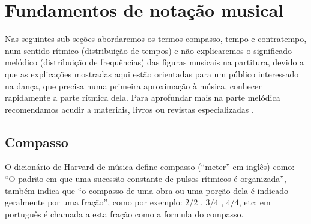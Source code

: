
\chapter{Fundamentos de notação musical}
Nas seguintes sub seções abordaremos os termos compasso, tempo e contratempo,
num sentido rítmico (distribuição de tempos) e não explicaremos o significado 
melódico (distribuição de frequências) das 
figuras musicais na partitura, devido a que as explicações mostradas aqui estão
orientadas para um público interessado na dança, que precisa numa primeira 
aproximação à música, conhecer rapidamente a parte rítmica dela. Para aprofundar mais na parte 
melódica recomendamos acudir a materiais, livros ou revistas especializadas \cite{medteoria}
\cite{azevedocompor} \cite{alves2004teoria} \cite{mascarenhascurso} \cite{adolfo2002musica} \cite{grabner2001teoria}.
\section{Compasso}
\label{sec:compaso}

O dicionário de Harvard de música \cite{randel2003harvard} define compasso (``meter'' em inglês)
como: ``O padrão em que uma sucessão constante de pulsos rítmicos é organizada'', também indica que
``o compasso de uma obra ou uma porção dela é indicado geralmente por uma fração'', como por exemplo:
${2}/{2}$ , ${3}/{4}$ , ${4}/{4}$, etc; em português é chamada a esta fração como a formula do compasso. 


